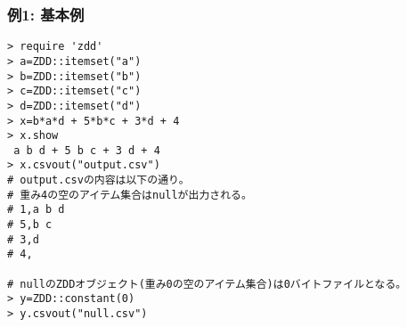 \subsubsection*{例1: 基本例}



\begin{Verbatim}[baselinestretch=0.7,frame=single]
> require 'zdd'
> a=ZDD::itemset("a")
> b=ZDD::itemset("b")
> c=ZDD::itemset("c")
> d=ZDD::itemset("d")
> x=b*a*d + 5*b*c + 3*d + 4
> x.show
 a b d + 5 b c + 3 d + 4
> x.csvout("output.csv")
# output.csvの内容は以下の通り。
# 重み4の空のアイテム集合はnullが出力される。
# 1,a b d
# 5,b c
# 3,d
# 4,

# nullのZDDオブジェクト(重み0の空のアイテム集合)は0バイトファイルとなる。
> y=ZDD::constant(0)
> y.csvout("null.csv")
\end{Verbatim}
